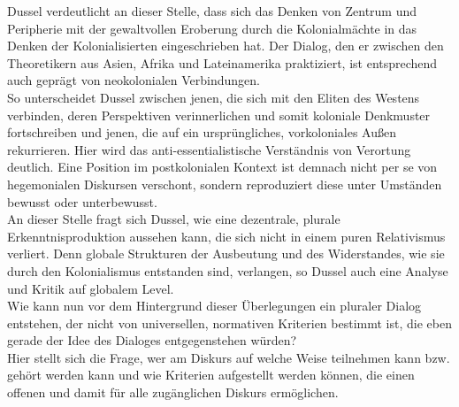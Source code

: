 \noindent Dussel verdeutlicht an dieser Stelle, dass sich das Denken von Zentrum und
Peripherie mit der gewaltvollen Eroberung durch die Kolonialmächte in das Denken
der Kolonialisierten eingeschrieben hat. Der Dialog, den er zwischen den
Theoretikern aus Asien, Afrika und Lateinamerika praktiziert, ist entsprechend
auch geprägt von neokolonialen Verbindungen. \\
So unterscheidet Dussel zwischen
jenen, die sich mit den Eliten des Westens verbinden, deren Perspektiven
verinnerlichen und somit koloniale Denkmuster fortschreiben und jenen, die auf
ein ursprüngliches, vorkoloniales Außen rekurrieren. Hier wird das
anti-essentialistische Verständnis von Verortung deutlich. Eine Position im
postkolonialen Kontext\footnotemark {} ist demnach nicht per se von hegemonialen Diskursen
verschont, sondern reproduziert diese unter Umständen bewusst oder unterbewusst.\\

\noindent An dieser Stelle fragt sich Dussel, wie eine dezentrale, plurale
Erkenntnisproduktion aussehen kann, die sich nicht in einem puren Relativismus
verliert. Denn globale Strukturen der Ausbeutung und des Widerstandes, wie sie
durch den Kolonialismus entstanden sind, verlangen, so Dussel auch eine Analyse
und Kritik auf globalem Level. \\
Wie kann nun vor dem Hintergrund dieser
Überlegungen ein pluraler Dialog entstehen, der nicht von universellen,
normativen Kriterien bestimmt ist, die eben gerade der Idee des Dialoges
entgegenstehen würden?\\

\noindent Hier stellt sich die Frage, wer am Diskurs auf welche Weise teilnehmen kann bzw.
gehört werden kann und wie Kriterien aufgestellt werden können, die einen
offenen und damit für alle zugänglichen Diskurs ermöglichen.\\

